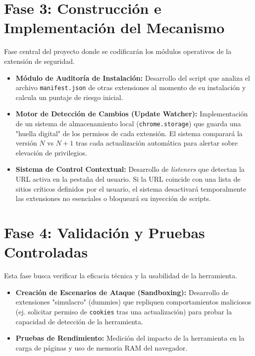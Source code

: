 \documentclass[12pt,oneside]{report}
\begin{document}
\section{Fase 3: Construcción e Implementación del Mecanismo}
Fase central del proyecto donde se codificarán los módulos operativos de la extensión de seguridad.
\begin{itemize}
    \item \textbf{Módulo de Auditoría de Instalación:} Desarrollo del script que analiza el archivo \texttt{manifest.json} de otras extensiones al momento de su instalación y calcula un puntaje de riesgo inicial.
    \item \textbf{Motor de Detección de Cambios (Update Watcher):} Implementación de un sistema de almacenamiento local (\texttt{chrome.storage}) que guarda una "huella digital" de los permisos de cada extensión. El sistema comparará la versión $N$ vs $N+1$ tras cada actualización automática para alertar sobre elevación de privilegios.
    \item \textbf{Sistema de Control Contextual:} Desarrollo de \textit{listeners} que detectan la URL activa en la pestaña del usuario. Si la URL coincide con una lista de sitios críticos definidos por el usuario, el sistema desactivará temporalmente las extensiones no esenciales o bloqueará su inyección de scripts.
\end{itemize}

\section{Fase 4: Validación y Pruebas Controladas}
Esta fase busca verificar la eficacia técnica y la usabilidad de la herramienta.
\begin{itemize}
    \item \textbf{Creación de Escenarios de Ataque (Sandboxing):} Desarrollo de extensiones "simulacro" (dummies) que repliquen comportamientos maliciosos (ej. solicitar permiso de \texttt{cookies} tras una actualización) para probar la capacidad de detección de la herramienta.
    \item \textbf{Pruebas de Rendimiento:} Medición del impacto de la herramienta en la carga de páginas y uso de memoria RAM del navegador.
\end{itemize}

\endgroup

\end{document}

